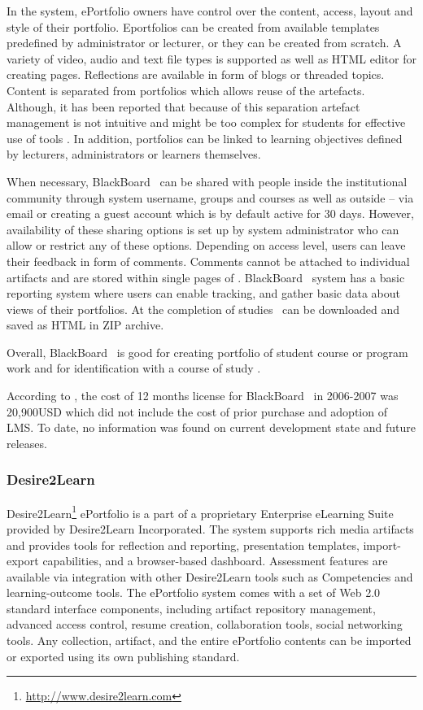 In the system, ePortfolio owners have control over the content, access, layout
and style of their portfolio. Eportfolios can be created from available
templates predefined by administrator or lecturer, or they can be created from
scratch. A variety of video, audio and text file types is supported as well as
HTML editor for creating pages. Reflections are available in form of blogs or
threaded topics. Content is separated from portfolios which allows reuse of the
artefacts. Although, it has been reported that because of this separation
artefact management is not intuitive and might be too complex for students for
effective use of tools \citep{Clark2009}. In addition, portfolios can be linked
to learning objectives defined by lecturers, administrators or learners themselves.

When necessary, BlackBoard \ep~can be shared with people inside the
institutional community through system username, groups and courses as well as
outside -- via email or creating a guest account which is by default active for
30 days. However, availability of these sharing options is set up by system
administrator who can allow or restrict any of these options. Depending on
access level, users can leave their feedback in form of comments. Comments
cannot be attached to individual artifacts and are stored within single pages of
\ep. BlackBoard \ep~system has a basic reporting system where users can enable
tracking, and gather basic data about views of their portfolios. At the
completion of studies \ep~can be downloaded and saved as HTML in ZIP archive.

Overall, BlackBoard \ep~is good for creating portfolio of student course or
program work and for identification with a course of study
\citep{UniversityofTorontoScarborough2010}. 

According to \citet{Sweat-Guy2007}, the cost of 12 months license for
BlackBoard \ep~in 2006-2007 was 20,900USD which did not include the cost of
prior purchase and adoption of LMS. To date, no information was found on current
development state and future releases.

\subsubsection{Desire2Learn}
Desire2Learn\footnote{\url{http://www.desire2learn.com}} ePortfolio is a part of
a proprietary Enterprise eLearning Suite provided by Desire2Learn Incorporated.
The system supports rich media artifacts and provides tools for reflection and
reporting, presentation templates, import-export capabilities, and a
browser-based dashboard. Assessment features are available via integration with
other Desire2Learn tools such as Competencies and learning-outcome tools. The
ePortfolio system comes with a set of Web 2.0 standard interface components,
including artifact repository management, advanced access control, resume
creation, collaboration tools, social networking tools. Any collection,
artifact, and the entire ePortfolio contents can be imported or exported using
its own publishing standard.

